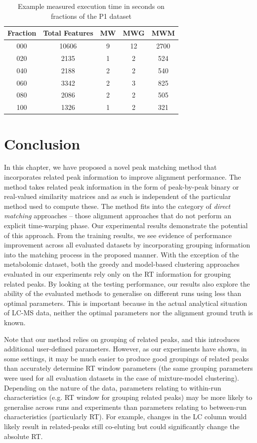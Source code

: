 \begin{table}[!htbp]
\noindent \begin{centering}
\begin{tabular}{|c|c|c|c|c|}
\hline 
\textbf{Fraction} & \textbf{Total Features} & \textbf{MW} & \textbf{MWG} & \textbf{MWM}\tabularnewline
\hline 
\hline 
000 & 10606 & 9 & 12 & 2700\tabularnewline
\hline 
020 & 2135 & 1 & 2 & 524\tabularnewline
\hline 
040 & 2188 & 2 & 2 & 540\tabularnewline
\hline 
060 & 3342 & 2 & 3 & 825\tabularnewline
\hline 
080 & 2086 & 2 & 2 & 505\tabularnewline
\hline 
100 & 1326 & 1 & 2 & 321\tabularnewline
\hline 
\end{tabular}
\par\end{centering}
\caption{\label{tab:Running-Time-P1}Example measured execution time in seconds on fractions of the P1 dataset}
\end{table}

\section{Conclusion}

\label{sec:conc}
In this chapter, we have proposed a novel peak matching method that incorporates related peak information to improve alignment performance. The method takes related peak information in the form of peak-by-peak binary or real-valued similarity matrices and as such is independent of the particular method used to compute these. The method fits into the category of \emph{direct matching} approaches -- those alignment approaches that do not perform an explicit time-warping phase. Our experimental results demonstrate the potential of this approach. From the training results, we see evidence of performance improvement across all evaluated datasets by incorporating grouping information into the matching process in the proposed manner. With the exception of the metabolomic dataset, both the greedy and model-based clustering approaches evaluated in our experiments rely only on the \ac{RT} information for grouping related peaks. By looking at the testing performance, our results also explore the ability of the evaluated methods to generalise on different runs using less than optimal parameters. This is important because in the actual analytical situation of LC-MS data, neither the optimal parameters nor the alignment ground truth is known. 

Note that our method relies on grouping of related peaks, and this introduces additional user-defined parameters. However, as our experiments have shown, in some settings, it may be much easier to produce good groupings of related peaks than accurately determine \ac{RT} window parameters (the same grouping parameters were used for all evaluation datasets in the case of mixture-model clustering). Depending on the nature of the data, parameters relating to within-run characteristics (e.g. \ac{RT} window for grouping related peaks) may be more likely to generalise across runs and experiments than parameters relating to between-run characteristics (particularly \ac{RT}). For example, changes in the \ac{LC} column would likely result in related-peaks still co-eluting but could significantly change the absolute \ac{RT}. 

